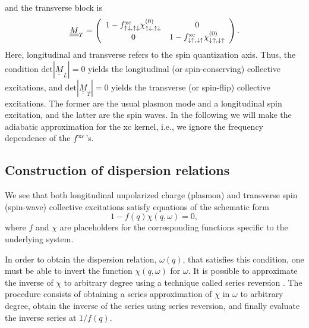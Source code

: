 \documentclass[aps,prb,twocolumn,superscriptaddress]{revtex4-2}
\newcommand{\w}{\omega}
\newcommand{\ua}{\uparrow}
\newcommand{\da}{\downarrow}
\begin{document}
and the transverse block is
\begin{equation}
\underline{\underline{M}}_T = \left( \begin{array}{cc} 1-f_{\ua\da,\ua\da}^{\rm xc}\chi_{\ua\da,\ua\da}^{(0)} &0\\
0 & 1-f_{\da\ua,\da\ua}^{\rm xc}\chi_{\da\ua,\da\ua}^{(0)}  \end{array}\right).
\label{eq:MTransverse}
\end{equation}
Here, longitudinal and transverse refers to the spin quantization axis. Thus, the condition $\mbox{det}|\underline{\underline{M}}_L|=0$ yields
the longitudinal (or spin-conserving) collective excitations, and $\mbox{det}|\underline{\underline{M}}_T|=0$ yields the transverse (or spin-flip) collective excitations.
The former are the usual plasmon mode and a longitudinal spin excitation, and the latter are the spin waves.
In the following we will make the adiabatic approximation for the xc kernel, i.e., we ignore the frequency dependence of the $f^{\rm xc}$'s.

\subsection{Construction of dispersion relations}\label{sec2B}

We see that both longitudinal unpolarized charge (plasmon) and transverse spin (spin-wave) collective excitations satisfy equations of the schematic form
\begin{equation}\label{eq_coll}
  1-f(q) \chi(q,\w) = 0,
\end{equation}
where $f$ and $\chi$ are placeholders for the corresponding functions specific to the underlying system.

In order to obtain the dispersion relation, $\w(q)$, that satisfies this condition, one must be able to invert the function $\chi(q,\w)$ for $\w$.
It is possible to approximate the inverse of $\chi$ to arbitrary degree using a technique called series reversion \cite{Abramowitz}.
The procedure consists of obtaining a series approximation of $\chi$ in $\w$ to arbitrary degree, obtain the inverse of the series using series reversion, and finally evaluate the inverse series at $1/f(q)$.
\end{document}
